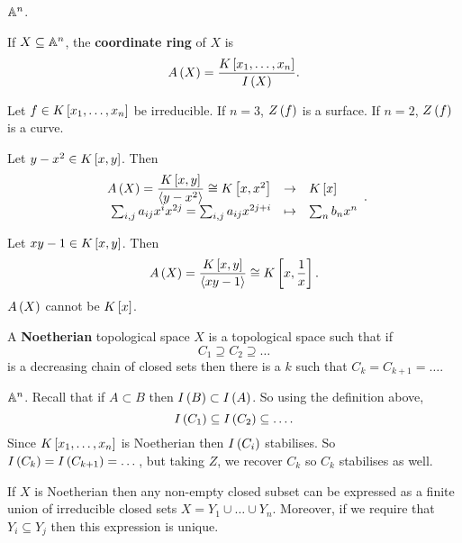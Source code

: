 \begin{example}
$ \A^n $.
\end{example}

\begin{definition}
If $ X \subseteq \A^n $, the \textbf{coordinate ring} of $ X $ is
$$ A\rb{X} = \dfrac{K\sb{x_1, \dots, x_n}}{I\rb{X}}. $$
\end{definition}


\begin{example}
Let $ f \in K\sb{x_1, \dots, x_n} $ be irreducible. If $ n = 3 $, $ Z\rb{f} $ is a surface. If $ n = 2 $, $ Z\rb{f} $ is a curve.
\end{example}

\begin{example}
Let $ y - x^2 \in K\sb{x, y} $. Then
$$ \function{A\rb{X} = \dfrac{K\sb{x, y}}{\ab{y - x^2}} \cong K\sb{x, x^2}}{K\sb{x}}{\sum_{i, j} a_{ij}x^ix^{2j} = \sum_{i, j} a_{ij}x^{2j + i}}{\sum_n b_nx^n}. $$
\end{example}

\begin{example}
Let $ xy - 1 \in K\sb{x, y} $. Then
$$ A\rb{X} = \dfrac{K\sb{x, y}}{\ab{xy - 1}} \cong K\sb{x, \dfrac{1}{x}}. $$
$ A\rb{X} $ cannot be $ K\sb{x} $.
\end{example}

\begin{definition}
A \textbf{Noetherian} topological space $ X $ is a topological space such that if
$$ C_1 \supseteq C_2 \supseteq \dots $$
is a decreasing chain of closed sets then there is a $ k $ such that $ C_k = C_{k + 1} = \dots $.
\end{definition}

\begin{example}
$ \A^n $. Recall that if $ A \subset B $ then $ I\rb{B} \subset I\rb{A} $. So using the definition above,
$$ I\rb{C_1} \subseteq I\rb{C_2} \subseteq \dots. $$
Since $ K\sb{x_1, \dots, x_n} $ is Noetherian then $ I\rb{C_i} $ stabilises. So $ I\rb{C_k} = I\rb{C_{k + 1}} = \dots $, but taking $ Z $, we recover $ C_k $ so $ C_k $ stabilises as well.
\end{example}

\begin{theorem}
If $ X $ is Noetherian then any non-empty closed subset can be expressed as a finite union of irreducible closed sets $ X = Y_1 \cup \dots \cup Y_n $. Moreover, if we require that $ Y_i \subseteq Y_j $ then this expression is unique.
\end{theorem}


